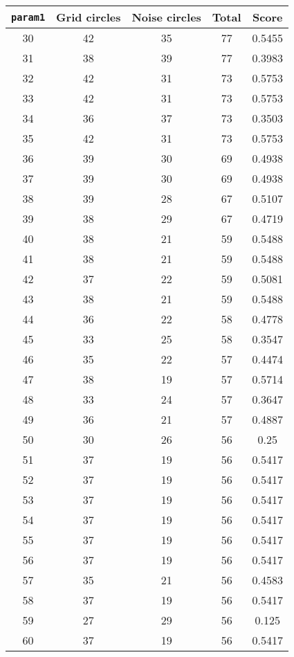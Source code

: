 \documentclass[letterpaper, 12pt]{article}
\begin{document}
\begin{longtable}{|c|c|c|c|c|}
\hline
\textbf{\texttt{param1}} & \textbf{Grid circles} & \textbf{Noise circles} & \textbf{Total} & \textbf{Score} \\
\hline
30 & 42 & 35 & 77 & 0.5455 \\
\hline
31 & 38 & 39 & 77 & 0.3983 \\
\hline
32 & 42 & 31 & 73 & 0.5753 \\
\hline
33 & 42 & 31 & 73 & 0.5753 \\
\hline
34 & 36 & 37 & 73 & 0.3503 \\
\hline
35 & 42 & 31 & 73 & 0.5753 \\
\hline
36 & 39 & 30 & 69 & 0.4938 \\
\hline
37 & 39 & 30 & 69 & 0.4938 \\
\hline
38 & 39 & 28 & 67 & 0.5107 \\
\hline
39 & 38 & 29 & 67 & 0.4719 \\
\hline
40 & 38 & 21 & 59 & 0.5488 \\
\hline
41 & 38 & 21 & 59 & 0.5488 \\
\hline
42 & 37 & 22 & 59 & 0.5081 \\
\hline
43 & 38 & 21 & 59 & 0.5488 \\
\hline
44 & 36 & 22 & 58 & 0.4778 \\
\hline
45 & 33 & 25 & 58 & 0.3547 \\
\hline
46 & 35 & 22 & 57 & 0.4474 \\
\hline
47 & 38 & 19 & 57 & 0.5714 \\
\hline
48 & 33 & 24 & 57 & 0.3647 \\
\hline
49 & 36 & 21 & 57 & 0.4887 \\
\hline
50 & 30 & 26 & 56 & 0.25 \\
\hline
51 & 37 & 19 & 56 & 0.5417 \\
\hline
52 & 37 & 19 & 56 & 0.5417 \\
\hline
53 & 37 & 19 & 56 & 0.5417 \\
\hline
54 & 37 & 19 & 56 & 0.5417 \\
\hline
55 & 37 & 19 & 56 & 0.5417 \\
\hline
56 & 37 & 19 & 56 & 0.5417 \\
\hline
57 & 35 & 21 & 56 & 0.4583 \\
\hline
58 & 37 & 19 & 56 & 0.5417 \\
\hline
59 & 27 & 29 & 56 & 0.125 \\
\hline
60 & 37 & 19 & 56 & 0.5417 \\

\end{longtable}
\end{document}
